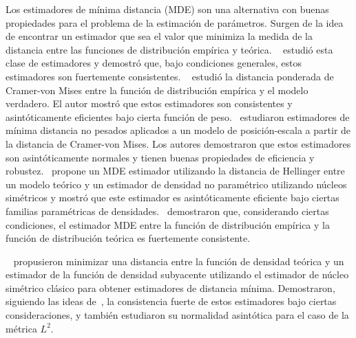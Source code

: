 Los estimadores de mínima distancia (MDE) son una  alternativa con buenas propiedades para el problema de la estimación de parámetros.
Surgen de la idea de encontrar un estimador que sea el valor que minimiza la medida de la distancia entre las funciones de distribución empírica y teórica.
~\citet{wolfowitz1953, wolfowitz1957} estudió esta clase de estimadores y demostró que, bajo condiciones generales, estos estimadores son fuertemente consistentes. 
~\citet{Boos1981} estudió la distancia ponderada de Cramer-von Mises entre la función de distribución empírica y el modelo verdadero.
El autor mostró que estos estimadores son consistentes y asintóticamente eficientes bajo cierta función de peso.~\citet{HettmanSperger1994} estudiaron estimadores de mínima distancia no pesados aplicados a un modelo de posición-escala a partir de la distancia de Cramer-von Mises. Los autores demostraron que estos estimadores son asintóticamente normales y tienen buenas propiedades de eficiencia y robustez.~\citet{beran1977} propone un MDE estimador utilizando la distancia de Hellinger entre un modelo teórico y un estimador de densidad no paramétrico utilizando núcleos simétricos y mostró que este estimador es asintóticamente eficiente bajo ciertas familias paramétricas de densidades.~\citet{parr1982} demostraron que, considerando ciertas condiciones, el estimador MDE entre la función de distribución empírica y la función de distribución teórica es fuertemente consistente.

~\citet{cao1995minimum} propusieron minimizar una distancia entre la función de densidad teórica y un estimador de la función de densidad subyacente utilizando el estimador de núcleo simétrico clásico para obtener estimadores de distancia mínima. Demostraron, siguiendo las ideas de~\citet{parr1982}, la consistencia fuerte de estos estimadores bajo ciertas consideraciones, y también estudiaron su normalidad asintótica para el caso de la métrica $ L^2 $.


